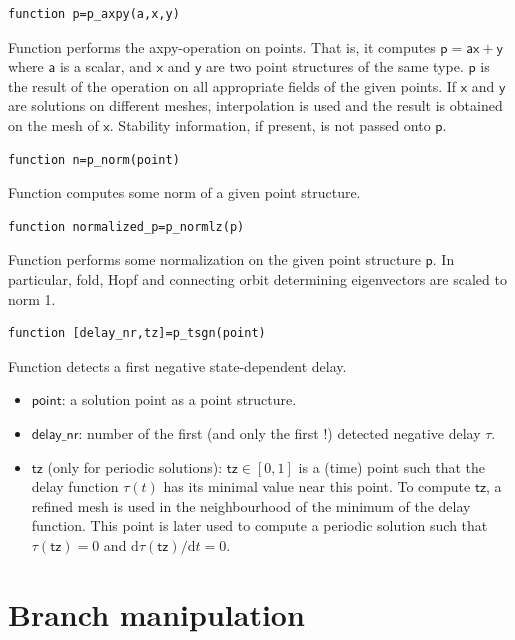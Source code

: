 \documentclass[10pt]{article}
\gdef \file#1{{\bfseries{\ttfamily{#1}}}}
\gdef \parm#1{{\mathsf{#1}}}
\gdef \d{{\mathrm d}}
\begin{document}
{{\small\begin{verbatim}
function p=p_axpy(a,x,y)
\end{verbatim}}
\noindent Function \file{p\_axpy} performs the axpy-operation on
points. That is, it computes $\parm{p}=\parm{a}\parm{x}+\parm{y}$ where 
$\parm{a}$ is a scalar, and
$\parm{x}$ and $\parm{y}$ are two point structures of the same type.
$\parm{p}$ is the result of the operation on all appropriate
fields of the given points.
If $\parm{x}$ and $\parm{y}$ are 
solutions on different meshes, interpolation
is used and the result is obtained on the mesh of $\parm{x}$.
Stability information, if present, is not passed onto $\parm{p}$.

{\small\begin{verbatim}
function n=p_norm(point)
\end{verbatim}}
\noindent Function \file{p\_norm} computes some 
norm of a given point structure.

{\small\begin{verbatim}
function normalized_p=p_normlz(p)
\end{verbatim}}
\noindent Function \file{p\_normlz} performs some normalization on the
given point structure $\parm{p}$. In particular, fold, Hopf and 
connecting orbit
determining eigenvectors are scaled to norm 1.

{\small\begin{verbatim}
function [delay_nr,tz]=p_tsgn(point)
\end{verbatim}}
\noindent Function \file{p\_tsgn} detects a first negative state-dependent 
delay.
\begin{itemize}
\item $\parm{point}$: a solution point as a point structure.
\item $\parm{delay\_nr}$: number of the first (and only the first !) 
detected negative delay $\tau$.
\item $\parm{tz}$ (only for periodic solutions): $\parm{tz}\in [0,1]$ 
is a (time) point such that the delay function $\tau(t)$ has its 
minimal value near this point. To compute $\parm{tz}$, a refined mesh 
is used in the neighbourhood of the minimum of the delay function.
This point is later used to compute a periodic solution
such that $\tau(\parm{tz})=0$ and ${\d}\tau(\parm{tz})/{\d}t=0$. 
\end{itemize}

\section{Branch manipulation}\label{branch_manipulation}

}
\end{document}
